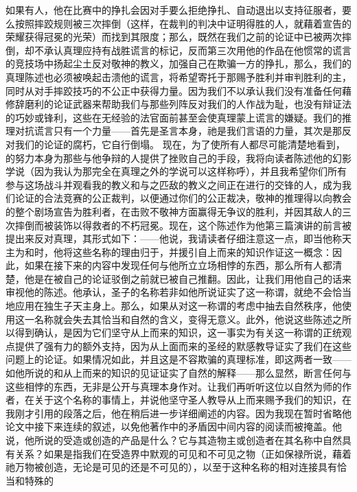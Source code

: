 如果有人，他在比赛中的挣扎会因对手要么拒绝挣扎、自动退出以支持征服者，要么按照摔跤规则被三次摔倒（这样，在裁判的判决中证明得胜的人，就藉着宣告的荣耀获得冠冕的光荣）而找到其限度；那么，既然在我们之前的论证中已被两次摔倒，却不承认真理应持有战胜谎言的标记，反而第三次用他的作品在他惯常的谎言的竞技场中扬起尘土反对敬神的教义，加强自己在欺骗一方的挣扎，那么，我们的真理陈述也必须被唤起击溃他的谎言，将希望寄托于那赐予胜利并审判胜利的主，同时从对手摔跤技巧的不公正中获得力量。因为我们不以承认我们没有准备任何藉修辞磨利的论证武器来帮助我们与那些列阵反对我们的人作战为耻，也没有辩证法的巧妙或锋利，这些在无经验的法官面前甚至会使真理蒙上谎言的嫌疑。我们的推理对抗谎言只有一个力量——首先是圣言本身，祂是我们言语的力量，其次是那反对我们的论证的腐朽，它自行倒塌。\newline{}\newline{} 现在，为了使所有人都尽可能清楚地看到，的努力本身为那些与他争辩的人提供了挫败自己的手段，我将向读者陈述他的幻影学说（因为我认为那完全在真理之外的学说可以这样称呼），并且我希望你们所有参与这场战斗并观看我的教义和与之匹敌的教义之间正在进行的交锋的人，成为我们论证的合法竞赛的公正裁判，以便通过你们的公正裁决，敬神的推理得以向教会的整个剧场宣告为胜利者，在击败不敬神方面赢得无争议的胜利，并因其敌人的三次摔倒而被装饰以得救者的不朽冠冕。现在，这个陈述作为他第三篇演讲的前言被提出来反对真理，其形式如下：——他说，我请读者仔细注意这一点，即当他称天主为和时，他将这些名称的理由归于，并援引自上而来的知识作证这一概念：因此，如果在接下来的内容中发现任何与他所立立场相悖的东西，那么所有人都清楚，他是在被自己的论证驳倒之前就已被自己推翻。因此，让我们用他自己的话来审视他的陈述。他承认，圣子的名称若非如他所说证实了这一称谓，就绝不会恰当地应用在独生子天主身上。那么，如果从对这一称谓的考虑中抽去自然秩序，他使用这一名称就会失去其恰当和自然的含义，变得无意义。此外，他说这些陈述之所以得到确认，是因为它们坚守从上而来的知识，这一事实为有关这一称谓的正统观点提供了强有力的额外支持，因为从上面而来的圣经的默感教导证实了我们在这些问题上的论证。如果情况如此，并且这是不容欺骗的真理标准，即这两者一致——如他所说的和从上而来的知识的见证证实了自然的解释——那么显然，断言任何与这些相悖的东西，无非是公开与真理本身作对。让我们再听听这位以自然为师的作者，在关于这个名称的事情上，并说他坚守圣人教导从上而来赐予我们的知识，在我刚才引用的段落之后，他在稍后进一步详细阐述的内容。因为我现在暂时省略他论文中接下来连续的叙述，以免他著作中的矛盾因中间内容的阅读而被掩盖。他说，他所说的受造或创造的产品是什么？它与其造物主或创造者在其名称中自然具有关系？如果是指我们在受造界中默观的可见和不可见之物（正如保禄所说，藉着祂万物被创造，无论是可见的还是不可见的），以至于这种名称的相对连接具有恰当和特殊的